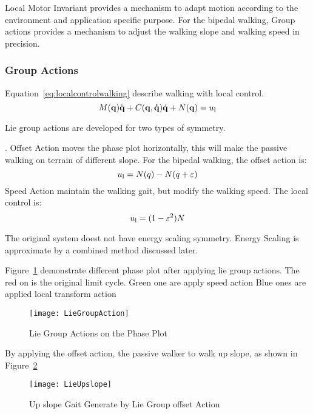 Local Motor Invariant provides a mechanism to adapt motion according to the environment and application specific purpose. 
For the bipedal walking, Group actions provides a mechanism to adjust the walking slope and walking speed in precision.




\subsubsection{Group Actions}

Equation~\ref{eq:localcontrolwalking} describe walking with local control.
\begin{equation}
\label{eq:localcontrolwalking}
M(\mathbf{q}) \ddot{\mathbf{q}} + C(\mathbf{q,\dot{q}})\dot{\mathbf{q}} + N(\mathbf{q}) = u_{\mathrm{l}}
\end{equation}




Lie group actions are developed for two types of symmetry.
\begin{itemize}

.
Offset Action moves the phase plot horizontally, this will make the passive walking on terrain of different slope.
For the bipedal walking, the offset action is:
\[
u_{\mathrm{l}}=N(q)-N(q+\varepsilon)
\]
Speed Action maintain the walking gait, but modify the walking speed.
The local control is:
\[  
u_{\mathrm{l}}=(1-\varepsilon^2)N
\]
\end{itemize}

The original system doest not have energy scaling symmetry.
Energy Scaling is approximate by a combined method discussed later.

Figure~\ref{fig:walkliegroupphase} demonstrate different phase plot after applying lie group actions.
The red on is the original limit cycle.
Green one are apply speed action
Blue ones are applied local transform action


\begin{figure}[!htbp]
  \begin{center}
     \texttt{[image: LieGroupAction]}
    \caption{Lie Group Actions on the Phase Plot}
    \label{fig:walkliegroupphase}
\end{center}
\end{figure}


By applying the offset action,   the passive walker to walk up slope, as shown in Figure~\ref{fig:liegroupupslope}
\begin{figure}[!htbp]
  \begin{center}
      \texttt{[image: LieUpslope]}
    \caption{Up slope Gait Generate by Lie Group offset Action}
    \label{fig:liegroupupslope}
\end{center}
\end{figure}

